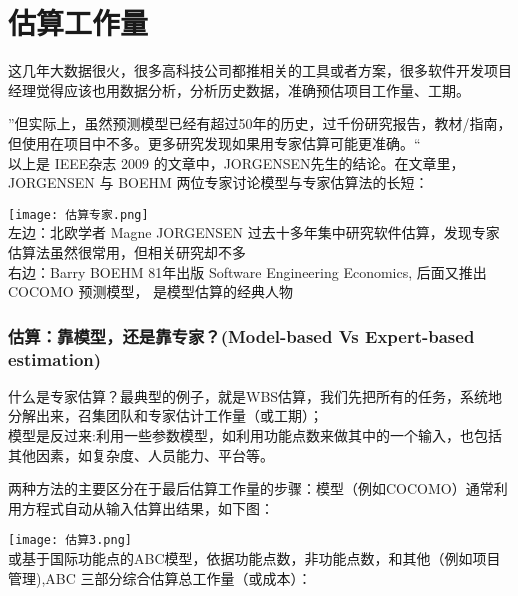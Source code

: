 \chapter{估算工作量} %

这几年大数据很火，很多高科技公司都推相关的工具或者方案，很多软件开发项目经理觉得应该也用数据分析，分析历史数据，准确预估项目工作量、工期。

''但实际上，虽然预测模型已经有超过50年的历史，过千份研究报告，教材/指南，但使用在项目中不多。更多研究发现如果用专家估算可能更准确。``\\
以上是 IEEE杂志 2009 的文章中，JORGENSEN先生的结论。在文章里，JORGENSEN
与 BOEHM 两位专家讨论模型与专家估算法的长短：


\texttt{[image: 估算专家.png]}\\

左边：北欧学者 Magne JORGENSEN
过去十多年集中研究软件估算，发现专家估算法虽然很常用，但相关研究却不多\\
右边：Barry BOEHM 81年出版 Software Engineering Economics, 后面又推出
COCOMO 预测模型， 是模型估算的经典人物

\hypertarget{ux4f30ux7b97ux9760ux6a21ux578bux8fd8ux662fux9760ux4e13ux5bb6model-based-vs-expert-based-estimation}{%
\subsection{估算：靠模型，还是靠专家？(Model-based Vs Expert-based
estimation)}\label{ux4f30ux7b97ux9760ux6a21ux578bux8fd8ux662fux9760ux4e13ux5bb6model-based-vs-expert-based-estimation}}

什么是专家估算？最典型的例子，就是WBS估算，我们先把所有的任务，系统地分解出来，召集团队和专家估计工作量（或工期）；\\
模型是反过来:利用一些参数模型，如利用功能点数来做其中的一个输入，也包括其他因素，如复杂度、人员能力、平台等。

两种方法的主要区分在于最后估算工作量的步骤：模型（例如COCOMO）通常利用方程式自动从输入估算出结果，如下图：


\texttt{[image: 估算3.png]}\\

或基于国际功能点的ABC模型，依据功能点数，非功能点数，和其他（例如项目管理),ABC
三部分综合估算总工作量（或成本）：



